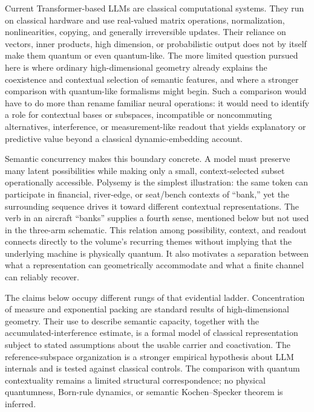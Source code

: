 \documentclass[
  aps,
  reprint,
  superscriptaddress,
  floatfix,
  nofootinbib,
  longbibliography
]{revtex4-2}
\begin{document}
Current Transformer-based LLMs are classical computational systems.  They
run on classical hardware and use real-valued matrix operations,
normalization, nonlinearities, copying, and generally irreversible updates.
Their reliance on vectors, inner products, high dimension, or probabilistic
output does not by itself make them quantum or even quantum-like.  The more
limited question pursued here is where ordinary high-dimensional geometry
already explains the coexistence and contextual selection of semantic
features, and where a stronger comparison with quantum-like formalisms might
begin.  Such a comparison would have to do more than rename familiar neural
operations: it would need to identify a role for contextual bases or subspaces,
incompatible or noncommuting alternatives, interference, or
measurement-like readout that yields explanatory or predictive value beyond
a classical dynamic-embedding account.

Semantic concurrency makes this boundary concrete.  A model must preserve
many latent possibilities while making only a small, context-selected subset
operationally accessible.  Polysemy is the simplest illustration: the same
token can participate in financial, river-edge, or seat/bench contexts of
``bank,'' yet the surrounding sequence drives it toward different contextual
representations.  The verb in an aircraft ``banks'' supplies a fourth sense,
mentioned below but not used in the three-arm schematic.  This relation among
possibility, context, and readout
connects directly to the volume's recurring themes without implying that the
underlying machine is physically quantum.  It also motivates a separation
between what a representation can geometrically accommodate and what a
finite channel can reliably recover.



The claims below occupy different rungs of that evidential
ladder.  Concentration of measure and exponential packing are standard
results of high-dimensional geometry.  Their use to describe semantic
capacity, together with the accumulated-interference estimate, is a formal
model of classical representation subject to stated assumptions about the
usable carrier and coactivation.  The reference-subspace organization is
a stronger empirical hypothesis about LLM internals and is tested against
classical controls.  The comparison with quantum contextuality remains a
limited structural correspondence; no physical quantumness, Born-rule
dynamics, or semantic Kochen--Specker theorem is inferred.
\end{document}
